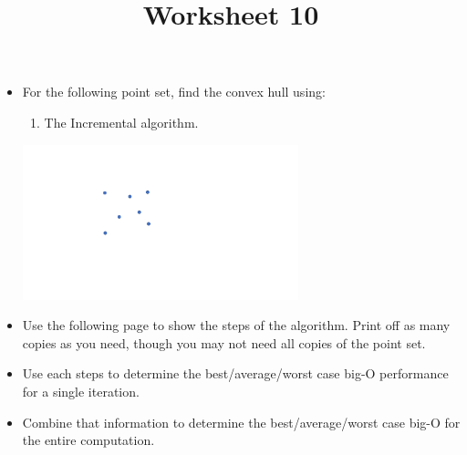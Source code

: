 \documentclass[a4paper,12pt]{article}
\title{Worksheet 10}
\begin{document}
\maketitle

\worksheetGroundRules

\assignmentInstructions

\begin{itemize}


\item For the following point set, find the convex hull using:

\begin{enumerate}
	\item The Incremental algorithm. 
\end{enumerate}

\vspace{-10pt}
\begin{center}
\includegraphics[width=8cm]{../images/chull.pdf}
\end{center}

\vspace{-10pt}
\item Use the following page to show the steps of the algorithm. Print off as many copies as you need, though you may not need all copies of the point set. 

\item Use each steps to determine the best/average/worst case big-O performance for a single iteration. 
\item Combine that information to determine the best/average/worst case big-O for the entire computation.



\end{itemize}


\worksheetSubmission




\newpage
\end{document}
